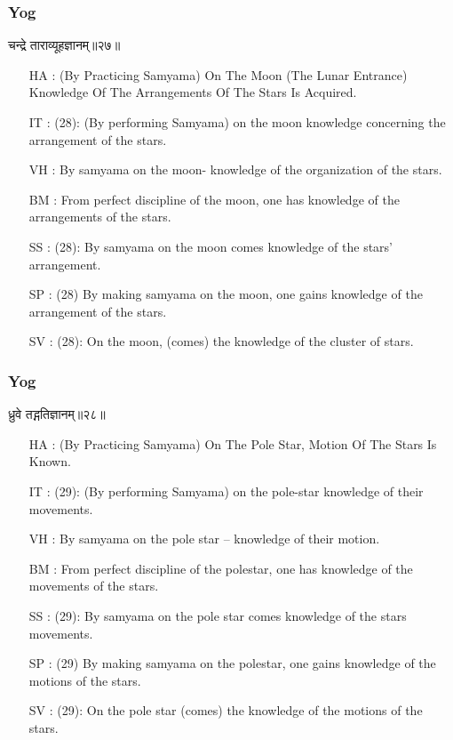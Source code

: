 \begin{frame}[fragile]\frametitle{Yog}
\begin{sanskrit}
चन्द्रे ताराव्यूहज्ञानम्॥२७॥
\end{sanskrit}

	\begin{itemize}
	\item [HA]: (By Practicing Samyama) On The Moon (The Lunar Entrance) Knowledge Of The Arrangements Of The Stars Is Acquired.
	\item [IT]: (28): (By performing Samyama) on the moon knowledge concerning the arrangement of the stars.
	\item [VH]: By samyama on the moon- knowledge of the organization of the stars.
	\item [BM]: From perfect discipline of the moon, one has knowledge of the arrangements of the stars.
	\item [SS]: (28): By samyama on the moon comes knowledge of the stars’ arrangement.
	\item [SP]: (28) By making samyama on the moon, one gains knowledge of the arrangement of the stars.
	\item [SV]: (28): On the moon, (comes) the knowledge of the cluster of stars. 
	\end{itemize}
\end{frame}

\begin{frame}[fragile]\frametitle{Yog}
\begin{sanskrit}
ध्रुवे तद्गतिज्ञानम्॥२८॥
\end{sanskrit}

	\begin{itemize}
	\item [HA]: (By Practicing Samyama) On The Pole Star, Motion Of The Stars Is Known.
	\item [IT]: (29): (By performing Samyama) on the pole-star knowledge of their movements.
	\item [VH]: By samyama on the pole star – knowledge of their motion.
	\item [BM]: From perfect discipline of the polestar, one has knowledge of the movements of the stars.
	\item [SS]: (29): By samyama on the pole star comes knowledge of the stars movements.
	\item [SP]: (29) By making samyama on the polestar, one gains knowledge of the motions of the stars.
	\item [SV]: (29): On the pole star (comes) the knowledge of the motions of the stars. 
	\end{itemize}
\end{frame}


